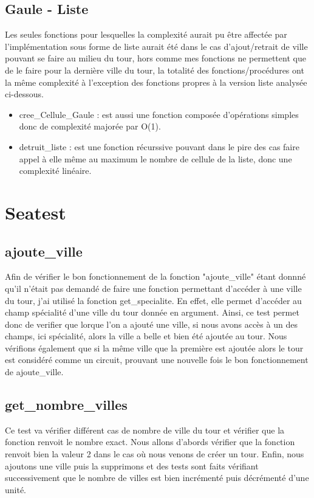 \documentclass[a4paper, 11pt, oneside]{article}
\begin{document}
\subsection{\textbf{Gaule - Liste}}
Les seules fonctions pour lesquelles la complexité aurait pu être affectée par l'implémentation sous 
forme de liste aurait été dans le cas d'ajout/retrait de ville pouvant se faire au milieu du tour, 
hors comme mes fonctions ne permettent que de le faire pour la dernière ville du tour, la totalité 
des fonctions/procédures ont la même complexité à l'exception des fonctions propres à la version liste 
analysée ci-dessous.
\begin{itemize}
    \item cree\_Cellule\_Gaule : est aussi une fonction composée d'opérations simples donc de complexité 
    majorée par O(1).
    \item detruit\_liste : est une fonction récurssive pouvant dans le pire des cas faire appel à elle même 
    au maximum le nombre de cellule de la liste, donc une complexité linéaire.
\end{itemize}

\section{\textbf{Seatest}}

\subsection{\textbf{ajoute\_ville}}
Afin de vérifier le bon fonctionnement de la fonction "ajoute\_ville" étant donnné qu'il n'était pas 
demandé de faire une fonction permettant d'accéder à une ville du tour, j'ai utilisé la fonction 
get\_specialite. En effet, elle permet d'accéder au champ spécialité d'une ville du tour donnée en argument. 
Ainsi, ce test permet donc de verifier que lorque l'on a ajouté une ville, si nous avons accès à un des champs, ici 
spécialité, alors la ville a belle et bien été ajoutée au tour. Nous vérifions également que si la même ville que la première 
est ajoutée alors le tour est considéré comme un circuit, prouvant une nouvelle fois le bon fonctionnement de ajoute\_ville.


\subsection{\textbf{get\_nombre\_villes}}
Ce test va vérifier différent cas de nombre de ville du tour et vérifier que la fonction 
renvoit le nombre exact. Nous allons d'abords vérifier que la fonction renvoit bien la valeur 2 dans le cas 
où nous venons de créer un tour. Enfin, nous ajoutons une ville puis la supprimons et des tests sont faits 
vérifiant successivement que le nombre de villes est bien incrémenté puis décrémenté d'une unité.
\end{document}
